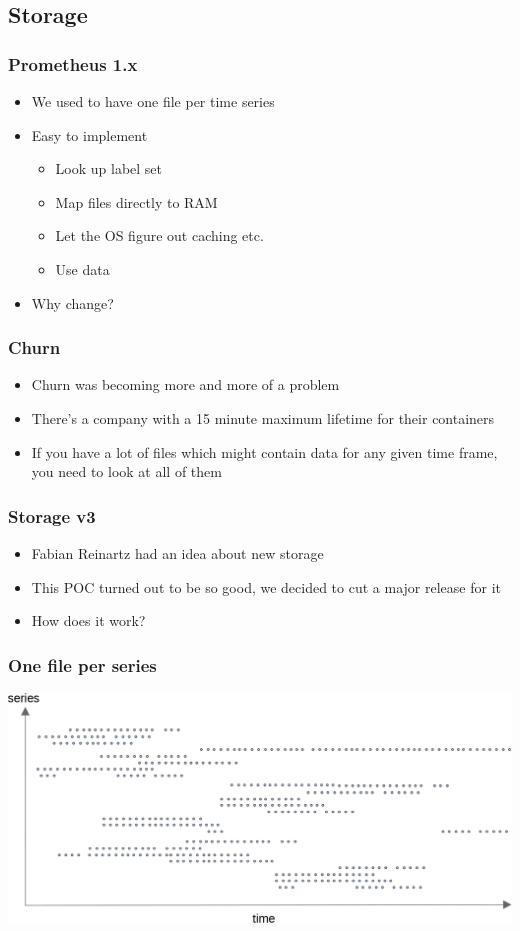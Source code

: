 \documentclass[t]{beamer}
\begin{document}
\subsection{Storage}

\begin{frame}
	\frametitle{Prometheus 1.x}
	\begin{itemize}
		\item We used to have one file per time series
		\item Easy to implement
		\begin{itemize}
			\item Look up label set
			\item Map files directly to RAM
			\item Let the OS figure out caching etc.
			\item Use data
		\end{itemize}
		\item Why change?
	\end{itemize}
\end{frame}

\begin{frame}
	\frametitle{Churn}
	\begin{itemize}
		\item Churn was becoming more and more of a problem
		\item There's a company with a 15 minute maximum lifetime for their containers
		\item If you have a lot of files which might contain data for any given time frame, you need to look at all of them
	\end{itemize}
\end{frame}

\begin{frame}
	\frametitle{Storage v3}
	\begin{itemize}
		\item Fabian Reinartz had an idea about new storage
		\item This POC turned out to be so good, we decided to cut a major release for it
		\item How does it work?
	\end{itemize}
\end{frame}

\begin{frame}
	\frametitle{One file per series}
	\includegraphics[width=\textwidth]{storage--file_per_series.png}
\end{frame}
\end{document}
